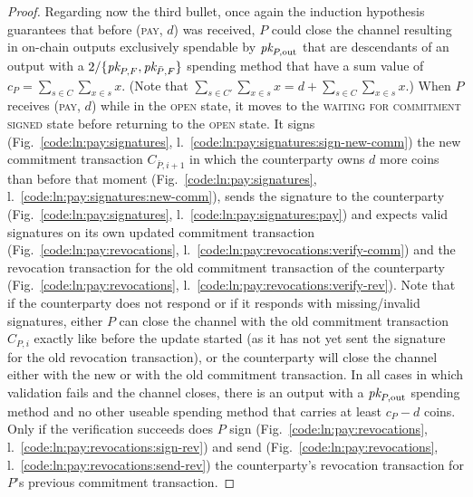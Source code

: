 \begin{proof}
  Regarding now the third bullet, once again the induction hypothesis guarantees
  that before (\textsc{pay}, $d$) was received, $P$ could close the channel
  resulting in on-chain outputs exclusively spendable by $\textit{pk}_{P, \mathrm{out}}$
  that are descendants of an output with a  $2/\{\textit{pk}_{P, F}, \textit{pk}_{\bar{P}, F}\}$
  spending method that have a sum value of $c_P = \sum\limits_{s \in C}
  \sum\limits_{x \in s} x$. (Note that $\sum\limits_{s \in C'} \sum\limits_{x
  \in s} x = d + \sum\limits_{s \in C} \sum\limits_{x \in s} x$.) When $P$
  receives (\textsc{pay}, $d$) while in the \textsc{open} state, it moves to the
  \textsc{waiting for commitment signed} state before returning to the
  \textsc{open} state. It signs (Fig.~\ref{code:ln:pay:signatures},
  l.~\ref{code:ln:pay:signatures:sign-new-comm}) the new commitment transaction
  $C_{\bar{P}, i+1}$ in which the counterparty owns $d$ more coins than before
  that moment (Fig.~\ref{code:ln:pay:signatures},
  l.~\ref{code:ln:pay:signatures:new-comm}), sends the signature to the
  counterparty (Fig.~\ref{code:ln:pay:signatures},
  l.~\ref{code:ln:pay:signatures:pay}) and expects valid signatures on its own
  updated commitment transaction (Fig.~\ref{code:ln:pay:revocations},
  l.~\ref{code:ln:pay:revocations:verify-comm}) and the revocation
  transaction for the old commitment transaction of the counterparty
  (Fig.~\ref{code:ln:pay:revocations},
  l.~\ref{code:ln:pay:revocations:verify-rev}). Note that if the counterparty
  does not respond or if it responds with missing/invalid signatures, either $P$
  can close the channel with the old commitment transaction $C_{P, i}$ exactly
  like before the update started (as it has not yet sent the signature for the
  old revocation transaction), or the counterparty will close the channel either
  with the new or with the old commitment transaction. In all cases in which
  validation fails and the channel closes, there is an output with a $\textit{pk}_{P,
  \mathrm{out}}$ spending method and no other useable spending method that
  carries at least $c_P - d$ coins. Only if the verification
  succeeds does $P$ sign (Fig.~\ref{code:ln:pay:revocations},
  l.~\ref{code:ln:pay:revocations:sign-rev}) and send
  (Fig.~\ref{code:ln:pay:revocations},
  l.~\ref{code:ln:pay:revocations:send-rev}) the counterparty's revocation
  transaction for $P$'s previous commitment transaction.


\end{proof}
